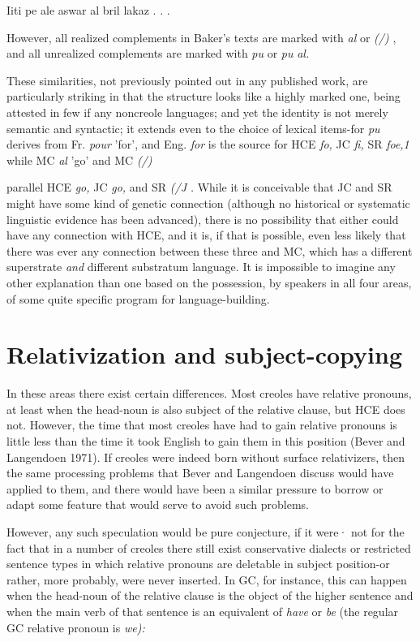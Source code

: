 \ea\label{ex:38}
 Iiti pe ale aswar al bril lakaz . . .
\glt
\z

However, all realized complements in Baker's texts are marked with \textit{al}
or \textit{(/)} , and all unrealized complements are marked with \textit{pu} or \textit{pu} \textit{al.}

These similarities, not previously pointed out in any published work, are particularly striking in that the structure looks like a highly marked one, being attested in few if any noncreole languages; and yet the identity is not merely semantic and syntactic; it extends even to the choice of lexical items-for \textit{pu} derives from Fr. \textit{pour} 'for', and Eng. \textit{for}
is the source for HCE \textit{fo,} JC \textit{fi,} SR \textit{foe,1 }while MC \textit{al} 'go' and MC \textit{(/)}

parallel HCE \textit{go,} JC \textit{go,} and SR \textit{(/J} \textit{.} While it is conceivable that JC and SR might have some kind of genetic connection (although no historical or systematic linguistic evidence has been advanced), there is no possi\-bility that either could have any connection with HCE, and it is, if that is possible, even less likely that there was ever any connection between these three and MC, which has a different superstrate \textit{and} different substratum language. It is impossible to imagine any other
explanation than one based on the possession, by speakers in all four areas, of some quite specific program for language-building.

\section{Relativization and subject-copying}

In these areas there exist certain differences. Most creoles have relative pronouns, at least when the head-noun is also subject of the relative clause, but HCE does not. However, the time that most creoles have had to gain relative pronouns is little less than the time it took English to gain them in this position (Bever and Langendoen 1971). If creoles were indeed born without surface relativizers, then the same processing problems that Bever and Langendoen discuss would have applied to them, and there would have been a similar pressure to borrow or adapt some feature that would serve to avoid such problems.

However, any such speculation would be pure conjecture, if it were· not for the fact that in a number of creoles there still exist con\-servative dialects or restricted sentence types in which relative pronouns are deletable in subject position-or rather, more probably, were never inserted. In GC, for instance, this can happen when the head-noun of the relative clause is the object of the higher sentence and when the main verb of that sentence is an equivalent of \textit{have} or \textit{be} (the regular GC relative pronoun is \textit{we):}

